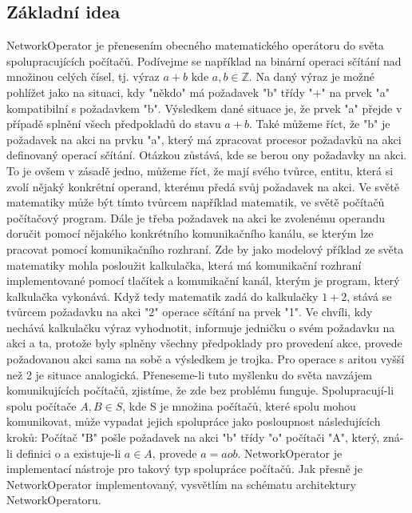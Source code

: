 \documentclass[12pt]{article}
\begin{document}
\subsection{Základní idea}
NetworkOperator je přenesením obecného matematického operátoru do světa spolupracujících počítačů. Podívejme se například na binární operaci sčítání nad množinou celých čísel, tj. výraz $a+b$ kde $a,b\in \mathbb{Z}$. Na daný výraz je možné pohlížet jako na situaci, kdy "někdo" má požadavek "b" třídy "+" na prvek "a" kompatibilní s požadavkem "b". Výsledkem dané situace je, že prvek "a" přejde v případě splnění všech předpokladů do stavu $a+b$. Také můžeme říct, že "b" je požadavek na akci na prvku "a", který má zpracovat procesor požadavků na akci definovaný operací sčítání. Otázkou zůstává, kde se berou ony požadavky na akci. To je ovšem v zásadě jedno, můžeme říct, že mají svého tvůrce, entitu, která si zvolí nějaký konkrétní operand, kterému předá svůj požadavek na akci. Ve světě matematiky může být tímto tvůrcem například matematik, ve světě počítačů počítačový program. Dále je třeba požadavek na akci ke zvolenému operandu doručit pomocí nějakého konkrétního komunikačního kanálu, se kterým lze pracovat pomocí komunikačního rozhraní. Zde by jako modelový příklad ze světa matematiky mohla posloužit kalkulačka, která má komunikační rozhraní implementované pomocí tlačítek a komunikační kanál, kterým je program, který kalkulačka vykonává.
Když tedy matematik zadá do kalkulačky $1+2$, stává se tvůrcem požadavku na akci "2" operace sčítání na prvek "1". Ve chvíli, kdy nechává kalkulačku výraz vyhodnotit, informuje jedničku o svém požadavku na akci a ta, protože byly splněny všechny předpoklady pro provedení akce, provede požadovanou akci sama na sobě a výsledkem je trojka.
Pro operace s aritou vyšší než 2 je situace analogická.
Přeneseme-li tuto myšlenku do světa navzájem komunikujících počítačů, zjistíme, že zde bez problému funguje. Spolupracují-li spolu počítače $A,B\in S$, kde S je množina počítačů, které spolu mohou komunikovat, může vypadat jejich spolupráce jako posloupnost následujících kroků: Počítač "B" pošle požadavek na akci "b" třídy "o" počítači "A", který, zná-li definici o a existuje-li $a\in A$, provede $a = a o b$.
NetworkOperator je implementací nástroje pro takový typ spolupráce počítačů. Jak přesně je NetworkOperator implementovaný, vysvětlím na schématu architektury NetworkOperatoru.
\end{document}
